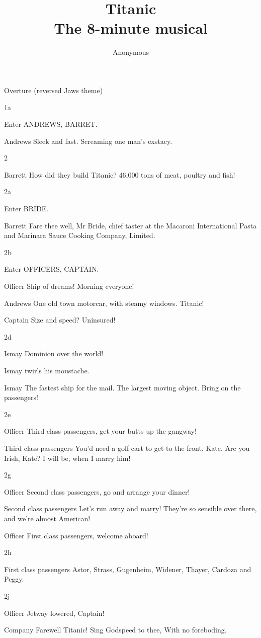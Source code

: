 \documentclass{screenplay}
\title{Titanic\\The 8-minute musical}
\author{Anonymous}
\newcommand{\andrews}[1]{\begin{dialogue}{Andrews}#1\end{dialogue}}
\newcommand{\barrett}[1]{\begin{dialogue}{Barrett}#1\end{dialogue}}
\newcommand{\captain}[1]{\begin{dialogue}{Captain}#1\end{dialogue}}
\newcommand{\ismay}[1]{\begin{dialogue}{Ismay}#1\end{dialogue}}
\newcommand{\officer}[1]{\begin{dialogue}{Officer}#1\end{dialogue}}
\newcommand{\third}[1]{\begin{dialogue}{Third class passengers}#1\end{dialogue}}
\newcommand{\second}[1]{\begin{dialogue}{Second class passengers}#1\end{dialogue}}
\newcommand{\first}[1]{\begin{dialogue}{First class passengers}#1\end{dialogue}}
\newcommand{\company}[1]{\begin{dialogue}{Company}#1\end{dialogue}}
\begin{document}
\coverpage
\fadein


Overture (reversed Jaws theme)

1a

Enter ANDREWS, BARRET.

\andrews{
    Sleek and fast.
    Screaming one man's exstacy.
}

2

\barrett{
    How did they build Titanic?
    46,000 tons of meat, poultry and fish!
}

2a

Enter BRIDE.

\barrett{
    Fare thee well, Mr Bride, chief taster at the
    Macaroni International Pasta and Marinara Sauce Cooking Company, Limited.
}

2b

Enter OFFICERS, CAPTAIN.

\officer{
    Ship of dreams!  Morning everyone!
}

\andrews{
    One old town motorcar, with steamy windows.  Titanic!
}

\captain{
    Size and speed? Uninsured!
}

2d

\ismay{
    Dominion over the world!
}

Ismay twirls his moustache.

\ismay{
    The fastest ship for the mail.
    The largest moving object.
    Bring on the passengers!
}

2e

\officer{
    Third class passengers, get your butts up the gangway!
}

\third{
    You'd need a golf cart to get to the front, Kate.
    Are you Irish, Kate?
    I will be, when I marry him!
}

2g

\officer{
    Second class passengers, go and arrange your dinner!
}

\second{
    Let's run away and marry!
    They're so sensible over there, and we're almost American!
}

\officer{
    First class passengers, welcome aboard!
}

2h

\first{
    Astor, Strass, Gugenheim, Widener, Thayer, Cardoza and Peggy.
}

2j

\officer{
    Jetway lowered, Captain!
}

\company{
    Farewell Titanic!
    Sing Godspeed to thee,
    With no foreboding.
}
\end{document}
